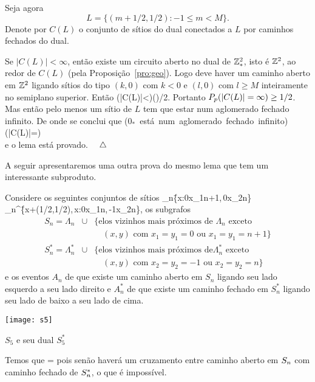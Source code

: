 
Seja agora $$L=\{(m+1/2,1/2):-1\leq m<M\}.$$ Denote por $C(L)$ o conjunto de sítios
do dual conectados a $L$ por caminhos fechados do dual.

Se $|C(L)|<\infty$, então existe um circuito aberto no dual de $\mathbb{Z}^2_\ast$, isto é
$\mathbb{Z}^2$, ao redor de $C(L)$ (pela Proposição~\ref{pro:geo}). Logo deve haver um
caminho aberto em $\mathbb{Z}^2$ ligando sítios do tipo $(k,0)$ com $k<0$ e $(l,0)$ com
$l\geq M$ inteiramente no semiplano superior. Então
\beq
\p(|C(L)|<\infty)\leq\p(\am)/2.
\eeq
Portanto $P_p(|C(L)|=\infty)\geq1/2$. Mas então pelo menos um sítio de $L$ tem
que estar num aglomerado fechado infinito. De onde se conclui que
\beqnn
\p(\mbox{$0_\ast$ está num aglomerado fechado
infinito})\ge{}\p(|C(L)|=\infty)\\
\ge{}
\eeqnn
e o lema está provado. $\quad\triangle$

\vs

A seguir apresentaremos uma outra prova do mesmo lema que tem um interessante
subproduto.

\vs



Considere os seguintes conjuntos de sítios
\beqnn
\Lambda_n\=\{x\in\zt:0\leq x_1\leq n+1,\,0\leq x_2\leq n\}\\
\Lambda_n^\ast\=\{x+(1/2,1/2),\,x\in\zt:0\leq x_1\leq n,\,-1\leq x_2\leq n\},
\eeqnn 
os subgrafos
\begin{eqnarray*}
S_n=\Lambda_n&\cup&\{\mbox{elos vizinhos mais próximos de $\Lambda_n$ exceto}\\
&&\quad\mbox{$(x,y)$ com $x_1=y_1=0$ ou $x_1=y_1=n+1$}\}\\
S_n^\ast=\Lambda_n^\ast&\cup&\{\mbox{elos vizinhos mais próximos de
$\Lambda_n^\ast$ exceto}\\
&&\quad\mbox{$(x,y)$ com $x_2=y_2=-1$ ou $x_2=y_2=n$}\}
\end{eqnarray*}
e os eventos
$A_n$ de que existe um caminho aberto em $S_n$ ligando seu lado esquerdo a seu lado
direito e $A_n^\ast$ de que existe um caminho fechado em $S_n^\ast$ ligando seu
lado de baixo a seu lado de cima.

\bef
%
\texttt{[image: s5]}
\caption{$S_5$ e seu dual $S_5^\ast$}
\eef

Temos que
\beq
\label{eq:dis}
\an\cap\asn=\emptyset
\eeq
pois senão haverá um cruzamento entre caminho aberto em $S_n$ com caminho
fechado de $S_n^\ast$, o que é impossível.

